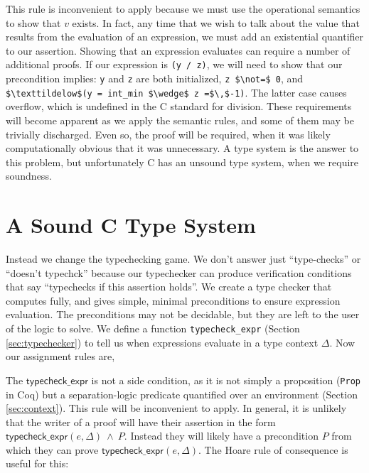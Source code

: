 \documentclass{puthesis}
\begin{document}
This rule is inconvenient to apply because we must use the operational
semantics to show that $v$ exists. In fact, any time that we wish to
talk about the value that results from the evaluation of an
expression, we must add an existential quantifier to our
assertion. Showing that an expression evaluates can require a number
of additional proofs. If our expression is \lstinline|(y / z)|, we
will need to show that our precondition implies: \lstinline|y| and
\lstinline|z| are both initialized, \lstinline|z $\not=$ 0|, and
\lstinline|$\texttildelow$(y = int_min $\wedge$ z =$\,$-1)|.  The
latter case causes overflow, which is undefined in the C standard for
division. These requirements will become apparent as we apply the
semantic rules, and some of them may be trivially discharged. Even
so, the proof will be required, when it was likely computationally
obvious that it was unnecessary. A type system is the answer to this
problem, but unfortunately C has an unsound type system, when we
require soundness.


\section{A Sound C Type System}

Instead we change the typechecking game. We don't answer just
``type-checks'' or ``doesn't typechck'' because our typechecker can produce
verification conditions that say ``typechecks if this assertion
holds''. We create a type checker that computes fully, and gives
simple, minimal preconditions to ensure expression evaluation. The
preconditions may not be decidable, but they are left to the user of
the logic to solve. We define a function \lstinline|typecheck_expr|
(Section \ref{sec:typechecker}) to tell us when expressions evaluate
in a type context $\Delta$.
Now our assignment rules are,

\vspace{-20pt}
\FloatBarrier

The $\mathsf{typecheck\_expr}$ is not a side condition, as
it is not simply a proposition (\lstinline|Prop| in Coq)
but a separation-logic predicate quantified over an environment
(Section \ref{sec:context}). This rule will be inconvenient to
apply. In general, it is unlikely that the writer of a proof will have
their assertion in the form
$\mathsf{typecheck\_expr}(e,\Delta)~\wedge~P$. Instead they will likely have
a precondition $P$ from which they can prove
$\mathsf{typecheck\_expr}(e,\Delta)$. The Hoare rule of consequence is
useful for this:
\end{document}
